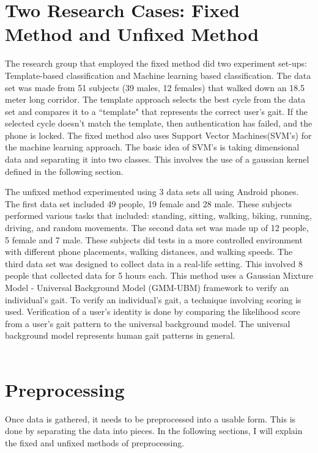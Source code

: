 \documentclass{sig-alternate}
\begin{document}
\section{Two Research Cases: Fixed \\ Method and Unfixed Method}
	The research group that employed the fixed method did two experiment set-ups: Template-based classification and Machine learning based classification. The data set was made from 51 subjects (39 males, 12 females) that walked down an 18.5 meter long corridor. The template approach selects the best cycle from the data set and compares it to a ``template" that represents the correct user's gait. If the selected cycle doesn't match the template, then authentication has failed, and the phone is locked. The fixed method also uses Support Vector Machines(SVM's) for the machine learning approach. The basic idea of SVM's is taking dimensional data and separating it into two classes. This involves the use of a gaussian kernel defined in the following section.
	
	The unfixed method experimented using 3 data sets all using Android phones. The first data set included 49 people, 19 female and 28 male. These subjects performed various tasks that included: standing, sitting, walking, biking, running, driving, and random movements. The second data set was made up of 12 people, 5 female and 7 male. These subjects did tests in a more controlled environment with different phone placements, walking distances, and walking speeds. The third data set was designed to collect data in a real-life setting. This involved 8 people that collected data for 5 hours each. This method uses a Gaussian Mixture Model - Universal Background Model (GMM-UBM) framework to verify an individual's gait. To verify an individual's gait, a technique involving scoring is used. Verification of a user's identity is done by comparing the likelihood score from a user's gait pattern to the universal background model. The universal background model represents human gait patterns in general.
\\
\\

\section{Preprocessing} 
	Once data is gathered, it needs to be preprocessed into a usable form. This is done by separating the data into pieces. In the following sections, I will explain the fixed and unfixed methods of preprocessing.
\end{document}
